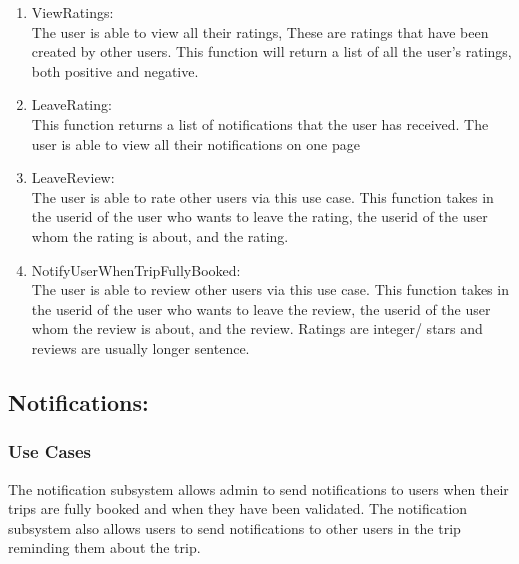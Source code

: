 \documentclass[hidelinks, 12pt, a4paper]{article}
\begin{document}
             \begin{enumerate}[label=U1.\arabic*]

                \item ViewRatings:\\
                    The user is able to view all their ratings, These are ratings that have been created by other users. This function will return a list of all the user’s ratings, both positive and negative.\\

                \item LeaveRating:\\
                	This function returns a list of notifications that the user has received. The user is able to view all their notifications on one page\\

                \item LeaveReview:\\
                    The user is able to rate other users via this use case. This function takes in the userid of the user who wants to leave the rating, the userid of the user whom the rating is about, and the rating.\\
                	
                \item NotifyUserWhenTripFullyBooked: \\
                    The user is able to review other users via this use case. This function takes in the userid of the user who wants to leave the review, the userid of the user whom the review is about, and the review. Ratings are integer/ stars and reviews are usually longer sentence.\\
               
            \end{enumerate}
            
    \newpage
                    \subsection{Notifications:}
                \subsubsection{Use Cases}
                  The notification subsystem allows admin to send notifications to users when their trips are fully booked and when they have been validated. The notification subsystem also allows users to send notifications to other users in the trip reminding them about the trip.
                  \vspace{1cm}
                    
\end{document}
